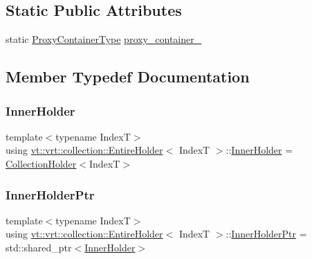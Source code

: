\subsection*{Static Public Attributes}
\begin{DoxyCompactItemize}
\item 
static \hyperlink{structvt_1_1vrt_1_1collection_1_1_entire_holder_a8d1ceab08d81edb0d45f48ee84a05eea}{Proxy\+Container\+Type} \hyperlink{structvt_1_1vrt_1_1collection_1_1_entire_holder_aa331cf7551bcc334e1b7a85700cc5d49}{proxy\+\_\+container\+\_\+}
\end{DoxyCompactItemize}


\subsection{Member Typedef Documentation}
\mbox{\label{structvt_1_1vrt_1_1collection_1_1_entire_holder_a2af69c9521932d43624a7ba5b64bebbe}} 
\subsubsection{\texorpdfstring{Inner\+Holder}{InnerHolder}}
{\footnotesize\ttfamily template$<$typename IndexT$>$ \\
using \hyperlink{structvt_1_1vrt_1_1collection_1_1_entire_holder}{vt\+::vrt\+::collection\+::\+Entire\+Holder}$<$ IndexT $>$\+::\hyperlink{structvt_1_1vrt_1_1collection_1_1_entire_holder_a2af69c9521932d43624a7ba5b64bebbe}{Inner\+Holder} =  \hyperlink{structvt_1_1vrt_1_1collection_1_1_collection_holder}{Collection\+Holder}$<$IndexT$>$}

\mbox{\label{structvt_1_1vrt_1_1collection_1_1_entire_holder_a05b515860b3cb0eac013993a5e487b72}} 
\subsubsection{\texorpdfstring{Inner\+Holder\+Ptr}{InnerHolderPtr}}
{\footnotesize\ttfamily template$<$typename IndexT$>$ \\
using \hyperlink{structvt_1_1vrt_1_1collection_1_1_entire_holder}{vt\+::vrt\+::collection\+::\+Entire\+Holder}$<$ IndexT $>$\+::\hyperlink{structvt_1_1vrt_1_1collection_1_1_entire_holder_a05b515860b3cb0eac013993a5e487b72}{Inner\+Holder\+Ptr} =  std\+::shared\+\_\+ptr$<$\hyperlink{structvt_1_1vrt_1_1collection_1_1_entire_holder_a2af69c9521932d43624a7ba5b64bebbe}{Inner\+Holder}$>$}

